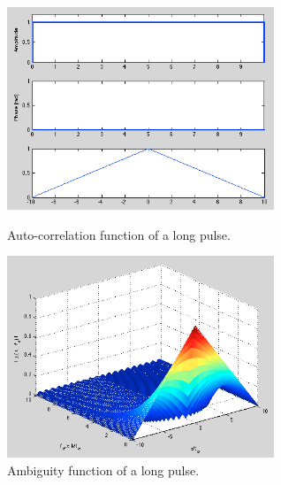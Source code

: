 \documentclass{article}
\begin{document}
\begin{figure}[h]
\begin{minipage}[t]{0.5\linewidth}
\centering
\includegraphics[width=8cm]{Figures/long_pulse_data.png}
\caption{Auto-correlation function of a long pulse.}
\label{fig:long_pulse_data}
\end{minipage}
\begin{minipage}[t]{0.5\linewidth}
\centering
\includegraphics[width=8cm]{Figures/long_pulse_3d.png}
\caption{Ambiguity function of a long pulse.}
\label{fig:long_pulse_3d}
\end{minipage}
\end{figure}
\end{document}

